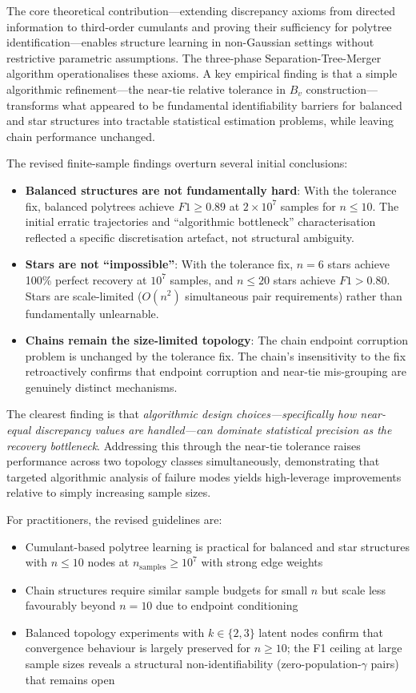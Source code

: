 \documentclass[11pt,a4paper]{article}
\numberwithin{equation}{section}
\begin{document}
The core theoretical contribution---extending discrepancy axioms from directed
information to third-order cumulants and proving their sufficiency for polytree
identification---enables structure learning in non-Gaussian settings without restrictive
parametric assumptions.  The three-phase Separation-Tree-Merger algorithm
operationalises these axioms.  A key empirical finding is that a simple algorithmic
refinement---the near-tie relative tolerance in $B_v$ construction---transforms what
appeared to be fundamental identifiability barriers for balanced and star structures
into tractable statistical estimation problems, while leaving chain performance
unchanged.

The revised finite-sample findings overturn several initial conclusions:
\begin{itemize}
\item \textbf{Balanced structures are not fundamentally hard}: With the tolerance fix,
balanced polytrees achieve $F1 \geq 0.89$ at $2 \times 10^7$ samples for $n \leq 10$.
The initial erratic trajectories and ``algorithmic bottleneck'' characterisation
reflected a specific discretisation artefact, not structural ambiguity.
\item \textbf{Stars are not ``impossible''}: With the tolerance fix, $n=6$ stars
achieve 100\% perfect recovery at $10^7$ samples, and $n \leq 20$ stars achieve
$F1 > 0.80$.  Stars are scale-limited ($O(n^2)$ simultaneous pair requirements) rather
than fundamentally unlearnable.
\item \textbf{Chains remain the size-limited topology}: The chain endpoint corruption
problem is unchanged by the tolerance fix.  The chain's insensitivity to the fix
retroactively confirms that endpoint corruption and near-tie mis-grouping are genuinely
distinct mechanisms.
\end{itemize}

The clearest finding is that \emph{algorithmic design choices---specifically how
near-equal discrepancy values are handled---can dominate statistical precision as the
recovery bottleneck}.  Addressing this through the near-tie tolerance raises performance
across two topology classes simultaneously, demonstrating that targeted algorithmic
analysis of failure modes yields high-leverage improvements relative to simply
increasing sample sizes.

For practitioners, the revised guidelines are:
\begin{itemize}
\item Cumulant-based polytree learning is practical for balanced and star structures
with $n \leq 10$ nodes at $n_{\text{samples}} \geq 10^7$ with strong edge weights
\item Chain structures require similar sample budgets for small $n$ but scale less
favourably beyond $n=10$ due to endpoint conditioning
\item Balanced topology experiments with $k \in \{2,3\}$ latent nodes confirm that
convergence behaviour is largely preserved for $n \geq 10$; the F1 ceiling at large
sample sizes reveals a structural non-identifiability (zero-population-$\gamma$ pairs)
that remains open
\end{itemize}
\end{document}
